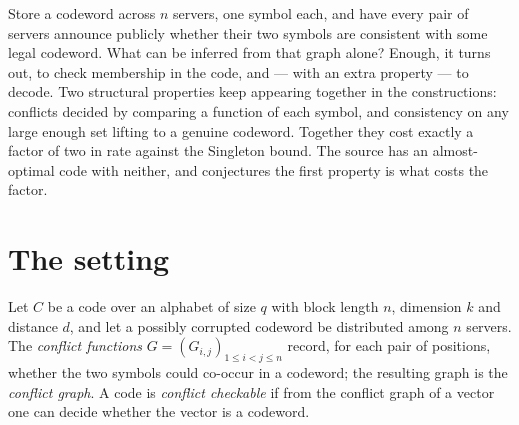\documentclass{conjura-conjecture}
\begin{document}

\vspace{0.4em}

\begin{informalconjecture}
Store a codeword across $n$ servers, one symbol each, and have every pair
of servers announce publicly whether their two symbols are consistent
with some legal codeword. What can be inferred from that graph alone?
Enough, it turns out, to check membership in the code, and --- with an
extra property --- to decode. Two structural properties keep appearing
together in the constructions: conflicts decided by comparing a function
of each symbol, and consistency on any large enough set lifting to a
genuine codeword. Together they cost exactly a factor of two in rate
against the Singleton bound. The source has an almost-optimal code with
neither, and conjectures the first property is what costs the factor.
\end{informalconjecture}

\section{The setting}\label{sec:setting}

Let $C$ be a code over an alphabet of size $q$ with block length $n$,
dimension $k$ and distance $d$, and let a possibly corrupted codeword be
distributed among $n$ servers. The \emph{conflict functions}
$G = (G_{i,j})_{1 \le i < j \le n}$ record, for each pair of positions,
whether the two symbols could co-occur in a codeword; the resulting
graph is the \emph{conflict graph}. A code is \emph{conflict checkable}
if from the conflict graph of a vector one can decide whether the vector
is a codeword.
\end{document}
